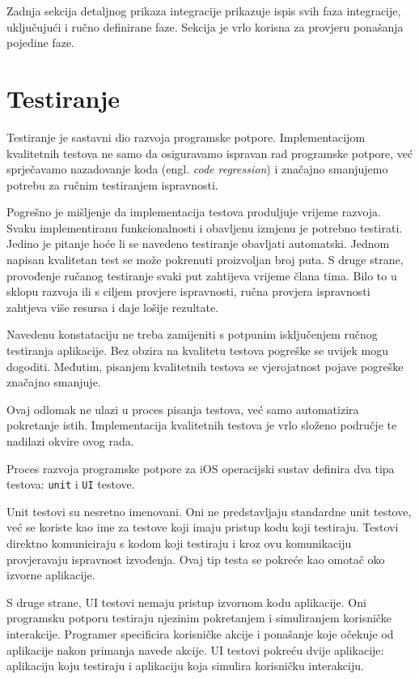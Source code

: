 \documentclass[times, utf8, diplomski, numeric]{fer}
\newcommand{\eng}[1]{(engl. \textit{#1})}
\begin{document}
Zadnja sekcija detaljnog prikaza integracije prikazuje ispis svih faza integracije, uključujući i ručno definirane faze. Sekcija je vrlo korisna za provjeru ponašanja pojedine faze.

\section{Testiranje}

Testiranje je sastavni dio razvoja programske potpore. Implementacijom kvalitetnih testova ne samo da osiguravamo ispravan rad programske potpore, već sprječavamo nazadovanje koda \eng{code regression} i značajno smanjujemo potrebu za ručnim testiranjem ispravnosti\citep{wiki:SoftwareTesting}.

Pogrešno je mišljenje da implementacija testova produljuje vrijeme razvoja. Svaku implementiranu funkcionalnosti i obavljenu izmjenu je potrebno testirati. Jedino je pitanje hoće li se navedeno testiranje obavljati automatski. Jednom napisan kvalitetan test se može pokrenuti proizvoljan broj puta. S druge strane, provođenje ručanog testiranje svaki put zahtijeva vrijeme člana tima. Bilo to u sklopu razvoja ili s ciljem provjere ispravnosti, ručna provjera ispravnosti zahtjeva više resursa i daje lošije rezultate.

Navedenu konstataciju ne treba zamijeniti s potpunim isključenjem ručnog testiranja aplikacije. Bez obzira na kvalitetu testova pogreške se uvijek mogu dogoditi. Međutim, pisanjem kvalitetnih testova se vjerojatnost pojave pogreške značajno smanjuje.

Ovaj odlomak ne ulazi u proces pisanja testova, već samo automatizira pokretanje istih. Implementacija kvalitetnih testova je vrlo složeno područje te nadilazi okvire ovog rada.

Proces razvoja programske potpore za iOS operacijski sustav definira dva tipa testova: \verb|unit| i \verb|UI| testove.

Unit testovi su nesretno imenovani. Oni ne predstavljaju standardne unit testove, već se koriste kao ime za testove koji imaju pristup kodu koji testiraju. Testovi direktno komuniciraju s kodom koji testiraju i kroz ovu komunikaciju provjeravaju ispravnost izvođenja. Ovaj tip testa se pokreće kao omotač oko izvorne aplikacije.

S druge strane, UI testovi nemaju pristup izvornom kodu aplikacije. Oni programsku potporu testiraju njezinim pokretanjem i simuliranjem korisničke interakcije. Programer specificira korisničke akcije i ponašanje koje očekuje od aplikacije nakon primanja navede akcije. UI testovi pokreću dvije aplikacije: aplikaciju koju testiraju i aplikaciju koja simulira korisničku interakciju.
\end{document}
